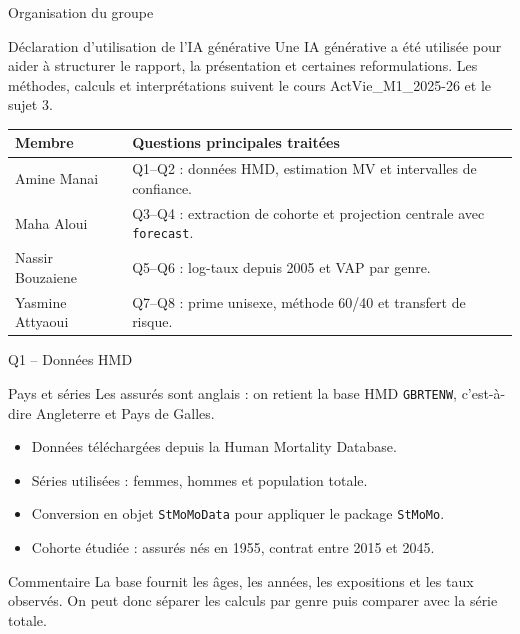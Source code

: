 \documentclass[11pt,aspectratio=169]{beamer}
\begin{document}
\begin{frame}{Organisation du groupe}
  \begin{block}{Déclaration d'utilisation de l'IA générative}
    Une IA générative a été utilisée pour aider à structurer le rapport, la présentation et certaines reformulations. Les méthodes, calculs et interprétations suivent le cours ActVie\_M1\_2025-26 et le sujet 3.
  \end{block}

  \vspace{0.12cm}
  \begin{center}
  \begin{tabular}{p{3.1cm}p{8.9cm}}
    \toprule
    Membre & Questions principales traitées \\
    \midrule
    Amine Manai & Q1--Q2 : données HMD, estimation MV et intervalles de confiance. \\
    Maha Aloui & Q3--Q4 : extraction de cohorte et projection centrale avec \texttt{forecast}. \\
    Nassir Bouzaiene & Q5--Q6 : log-taux depuis 2005 et VAP par genre. \\
    Yasmine Attyaoui & Q7--Q8 : prime unisexe, méthode 60/40 et transfert de risque. \\
    \bottomrule
  \end{tabular}
  \end{center}
\end{frame}

\begin{frame}{Q1 -- Données HMD}
  \begin{block}{Pays et séries}
    Les assurés sont anglais : on retient la base HMD \texttt{GBRTENW}, c'est-à-dire Angleterre et Pays de Galles.
  \end{block}

  \vspace{0.18cm}
  \begin{itemize}
    \item Données téléchargées depuis la Human Mortality Database.
    \item Séries utilisées : femmes, hommes et population totale.
    \item Conversion en objet \texttt{StMoMoData} pour appliquer le package \texttt{StMoMo}.
    \item Cohorte étudiée : assurés nés en 1955, contrat entre 2015 et 2045.
  \end{itemize}

  \vspace{0.12cm}
  \begin{block}{Commentaire}
    La base fournit les âges, les années, les expositions et les taux observés. On peut donc séparer les calculs par genre puis comparer avec la série totale.
  \end{block}
\end{frame}
\end{document}

